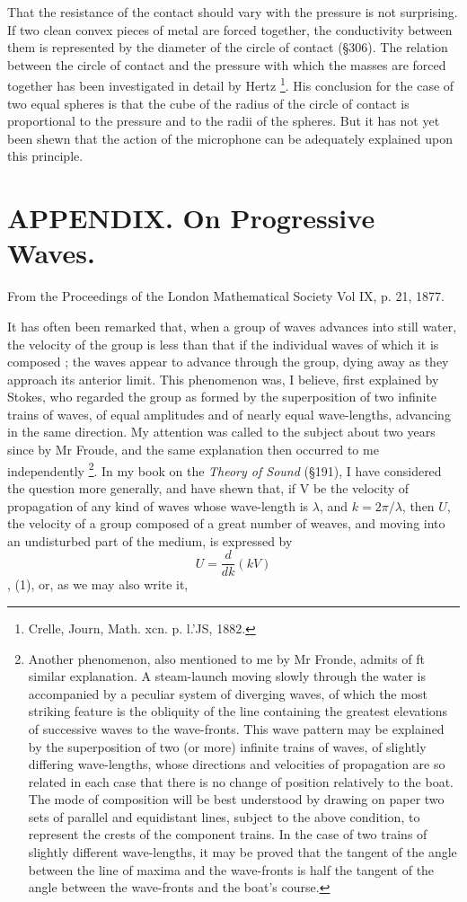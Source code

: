 That the resistance of the contact should vary with the
pressure is not surprising. If two clean convex pieces of metal
are forced together, the conductivity between them is represented
by the diameter of the circle of contact (§306). The relation
between the circle of contact and the pressure with which the
masses are forced together has been investigated in detail by
Hertz \footnote{Crelle, Journ, Math. xcn. p. l.'JS, 1882.}.
His conclusion for the case of two equal spheres is that
the cube of the radius of the circle of contact is proportional to
the pressure and to the radii of the spheres. But it has not yet
been shewn that the action of the microphone can be adequately
explained upon this principle.



\chapter{APPENDIX.  On Progressive Waves.} %

From the Proceedings of the London Mathematical Society Vol IX, p. 21, 1877.

It has often been remarked that, when a group of waves advances
into still water, the velocity of the group is less than that if the individual
waves of which it is composed ; the waves appear to advance
through the group, dying away as they approach its anterior limit.
This phenomenon was, I believe, first explained by Stokes, who regarded the
group as formed by the superposition of two infinite trains
of waves, of equal amplitudes and of nearly equal wave-lengths, advancing in
the same direction. My attention was called to the subject
about two years since by Mr Froude, and the same explanation then
occurred to me independently
\footnote{Another phenomenon, also mentioned to me by Mr Fronde, admits of ft similar
explanation. A steam-launch moving slowly through the water is accompanied by
a peculiar system of diverging waves, of which the most striking feature is the
obliquity of the line containing the greatest elevations of successive waves to the
wave-fronts. This wave pattern may be explained by the superposition of two
(or more) infinite trains of waves, of slightly differing wave-lengths, whose directions
and velocities of propagation are so related in each case that there is no change of
position relatively to the boat. The mode of composition will be best understood by
drawing on paper two sets of parallel and equidistant lines, subject to the above
condition, to represent the crests of the component trains. In the case of two trains
of slightly different wave-lengths, it may be proved that the tangent of the angle
between the line of maxima and the wave-fronts is half the tangent of the angle
between the wave-fronts and the boat’s course.}. In my book on the
\textit{Theory of Sound} (§191),
I have considered the question more generally, and
have shewn that, if V be the velocity of propagation of any kind of
waves whose  wave-length is
\(\lambda\),
and
\(k=2 \pi/\lambda\), then \(U\), the velocity of
a group composed of a great number of weaves, and moving into an undisturbed
part of the medium, is expressed by
\[ U = \frac{d}{dk} ( kV ) \],
(1), or, as we may also write it,

